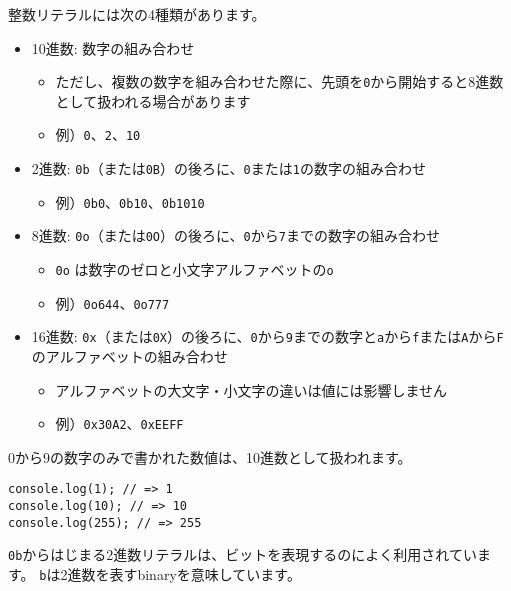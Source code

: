 整数リテラルには次の4種類があります。

\begin{itemize}
\item
  10進数: 数字の組み合わせ

  \begin{itemize}
  \item
    ただし、複数の数字を組み合わせた際に、先頭を\texttt{0}から開始すると8進数として扱われる場合があります
  \item
    例）\texttt{0}、\texttt{2}、\texttt{10}
  \end{itemize}
\item
  2進数:
  \texttt{0b}（または\texttt{0B}）の後ろに、\texttt{0}または\texttt{1}の数字の組み合わせ

  \begin{itemize}
  \item
    例）\texttt{0b0}、\texttt{0b10}、\texttt{0b1010}
  \end{itemize}
\item
  8進数:
  \texttt{0o}（または\texttt{0O}）の後ろに、\texttt{0}から\texttt{7}までの数字の組み合わせ

  \begin{itemize}
  \item
    \texttt{0o}
    は数字のゼロと小文字アルファベットの\texttt{o}
  \item
    例）\texttt{0o644}、\texttt{0o777}
  \end{itemize}
\item
  16進数:
  \texttt{0x}（または\texttt{0X}）の後ろに、\texttt{0}から\texttt{9}までの数字と\texttt{a}から\texttt{f}または\texttt{A}から\texttt{F}のアルファベットの組み合わせ

  \begin{itemize}
  \item
    アルファベットの大文字・小文字の違いは値には影響しません
  \item
    例）\texttt{0x30A2}、\texttt{0xEEFF}
  \end{itemize}
\end{itemize}

0から9の数字のみで書かれた数値は、10進数として扱われます。

\begin{lstlisting}
console.log(1); // => 1
console.log(10); // => 10
console.log(255); // => 255
\end{lstlisting}

\texttt{0b}からはじまる2進数リテラルは、ビットを表現するのによく利用されています。
\texttt{b}は2進数を表すbinaryを意味しています。

